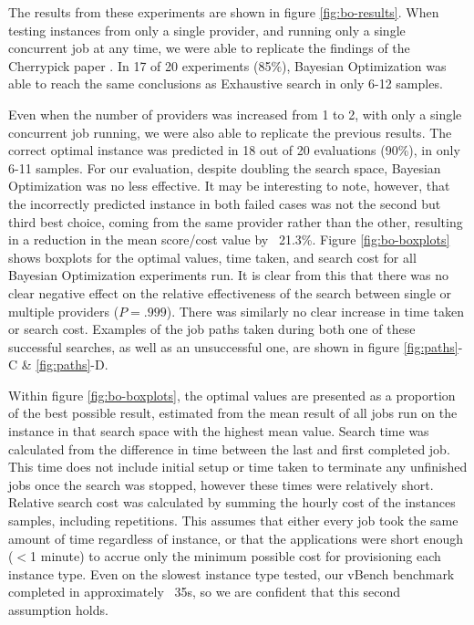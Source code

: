 \documentclass{report}
\begin{document}
The results from these experiments are shown in figure \ref{fig:bo-results}. When testing instances from only a single provider, and running only a single concurrent job at any time, we were able to replicate the findings of the Cherrypick paper \cite{Alipourfard2017}. In 17 of 20 experiments (85\%), Bayesian Optimization was able to reach the same conclusions as Exhaustive search in only 6-12 samples. 

Even when the number of providers was increased from 1 to 2, with only a single concurrent job running, we were also able to replicate the previous results. The correct optimal instance was predicted in 18 out of 20 evaluations (90\%), in only 6-11 samples. For our evaluation, despite doubling the search space, Bayesian Optimization was no less effective.  It may be interesting to note, however, that the incorrectly predicted instance in both failed cases was not the second but third best choice, coming from the same provider rather than the other, resulting in a reduction in the mean score/cost value by ~21.3\%.  Figure \ref{fig:bo-boxplots} shows boxplots for the optimal values, time taken, and search cost for all Bayesian Optimization experiments run. It is clear from this that there was no clear negative effect on the relative effectiveness of the search between single or multiple providers ($ P = .999 $). There was similarly no clear increase in time taken or search cost. Examples of the job paths taken during both one of these successful searches, as well as an unsuccessful one, are shown in figure \ref{fig:paths}-C \& \ref{fig:paths}-D. 

Within figure \ref{fig:bo-boxplots}, the optimal values are presented as a proportion of the best possible result, estimated from the mean result of all jobs run on the instance in that search space with the highest mean value. Search time was calculated from the difference in time between the last and first completed job. This time does not include initial setup or time taken to terminate any unfinished jobs once the search was stopped, however these times were relatively short. Relative search cost was calculated by summing the hourly cost of the instances samples, including repetitions. This assumes that either every job took the same amount of time regardless of instance, or that the applications were short enough ($<$1 minute) to accrue only the minimum possible cost for provisioning each instance type. Even on the slowest instance type tested, our vBench benchmark completed in approximately ~35s, so we are confident that this second assumption holds.
\end{document}
